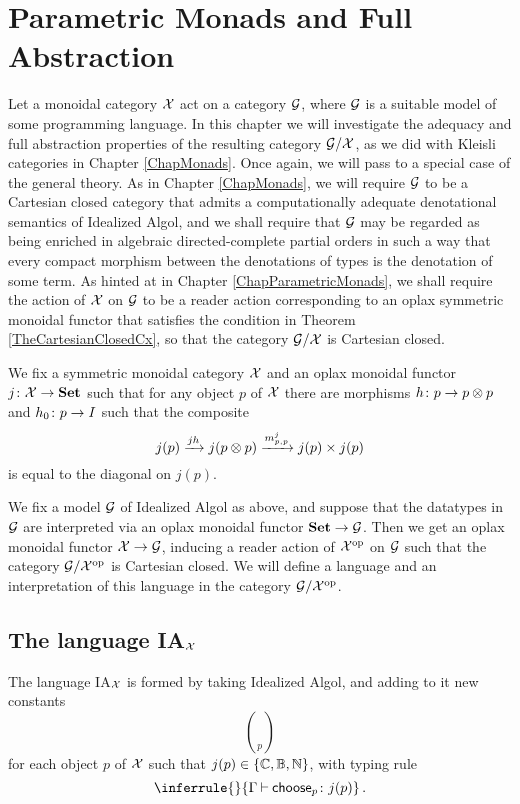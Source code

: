 \chapter{Parametric Monads and Full Abstraction}
\label{ChapParametricMonadsFullAbstraction}

Let a monoidal category $\mathcal X$ act on a category $\mathcal G$, where $\mathcal G$ is a suitable model of some programming language.  
In this chapter we will investigate the adequacy and full abstraction properties of the resulting category $\mathcal G/\mathcal X$, as we did with Kleisli categories in Chapter \ref{ChapMonads}.  
Once again, we will pass to a special case of the general theory.  
As in Chapter \ref{ChapMonads}, we will require $\mathcal G$ to be a Cartesian closed category that admits a computationally adequate denotational semantics of Idealized Algol, and we shall require that $\mathcal G$ may be regarded as being enriched in algebraic directed-complete partial orders in such a way that every compact morphism between the denotations of types is the denotation of some term.
As hinted at in Chapter \ref{ChapParametricMonads}, we shall require the action of $\mathcal X$ on $\mathcal G$ to be a reader action corresponding to an oplax symmetric monoidal functor that satisfies the condition in Theorem \ref{TheCartesianClosedCx}, so that the category $\mathcal G/\mathcal X$ is Cartesian closed.

We fix a symmetric monoidal category $\mathcal X$ and an oplax monoidal functor $j\colon \mathcal X \to {\normalfont\textbf{Set}}$ such that for any object $p$ of $\mathcal X$ there are morphisms $h\colon p \to p \otimes p$ and $h_0 \colon p \to I$ such that the composite
\[
  j(p) \xrightarrow{jh} j(p\otimes p) \xrightarrow{m^j_{p,p}} j(p) \times j(p)
  \]
is equal to the diagonal on $j(p)$.

We fix a model $\mathcal G$ of Idealized Algol as above, and suppose that the datatypes in $\mathcal G$ are interpreted via an oplax monoidal functor ${\normalfont\textbf{Set}} \to \mathcal G$.  
Then we get an oplax monoidal functor $\mathcal X \to \mathcal G$, inducing a reader action of $\mathcal X^{\mathrm{op}}$ on $\mathcal G$ such that the category $\mathcal G/\mathcal X^{\mathrm{op}}$ is Cartesian closed.  
We will define a language and an interpretation of this language in the category $\mathcal G/\mathcal X^{\mathrm{op}}$.

\newcommand{\IAXX}{{IA${}_{\X}$}\xspace}
\section{The language \IAXX}

\begin{definition}[{The language \IAXX}]
  The language \IAXX is formed by taking Idealized Algol, and adding to it new constants
  \[
    \choose_p
    \]
  for each object $p$ of $\mathcal X$ such that $j(p)\in\{\mathbb{C},\mathbb{B},\mathbb{N}\}$, with typing rule
  \[
    \inferrule{ }{\Gamma \ts \choose_p \from j(p)}\,.
    \]
\end{definition}

